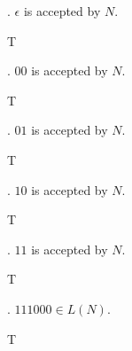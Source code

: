 \nextq
\tf. $\epsilon$ is accepted by $N$.
\\
\ANSWER
\begin{answerlong}
T
\end{answerlong}

\nextq
\tf. $00$ is accepted by $N$.
\\
\ANSWER
\begin{answerlong}
T
\end{answerlong}

\nextq
\tf. $01$ is accepted by $N$.
\\
\ANSWER
\begin{answerlong}
T
\end{answerlong}

\nextq
\tf. $10$ is accepted by $N$.
\\
\ANSWER
\begin{answerlong}
T
\end{answerlong}

\nextq
\tf. $11$ is accepted by $N$.
\\
\ANSWER
\begin{answerlong}
T
\end{answerlong}

\nextq
\tf. $111000 \in L(N)$.
\\
\ANSWER
\begin{answerlong}
T
\end{answerlong}

\newpage


